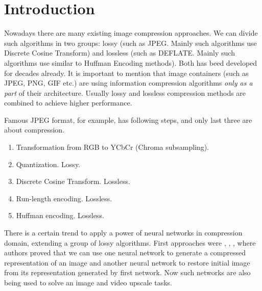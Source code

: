 \chapter{Introduction}

Nowadays there are many existing image compression approaches. We can divide such algorithms in two groups: lossy (such as JPEG. Mainly such algorithms use Discrete Cosine Transform) and lossless (such as DEFLATE. Mainly such algorithms use similar to Huffman Encoding methods). Both has beed developed for decades already. It is important to mention that image containers (such as JPEG, PNG, GIF etc.) are using information compression algorithms \textit{only as a part} of their architecture. Usually lossy and lossless compression methods are combined to achieve higher performance.

Famous JPEG format, for example, has following steps, and only last three are about compression.

\begin{enumerate}
    \item Transformation from RGB to YCbCr (Chroma subsampling).
    \item Quantization. Lossy.
    \item Discrete Cosine Transform. Lossless.
    \item Run-length encoding. Lossless.
    \item Huffman encoding. Lossless.
\end{enumerate}

There is a certain trend to apply a power of neural networks in compression domain, extending a group of lossy algorithms. First approaches were \cite{Balle_Laparra_Simoncelli_2017}, \cite{Theis_Shi_Cunningham_Huszar_2017}, \cite{Toderici_Vincent_Johnston_Hwang_Minnen_Shor_Covell_2017}, where authors proved that we can use one neural network to generate a compressed representation of an image and another neural network to restore initial image from its representation generated by first network. Now such networks are also being used to solve an image and video upscale tasks.

